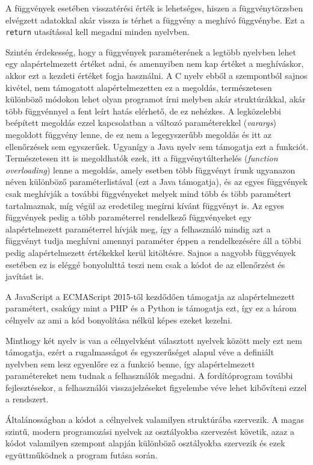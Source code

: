 A függvények esetében visszatérési érték is lehetséges, hiszen a függvénytörzsben elvégzett adatokkal akár vissza is térhet a függvény a meghívó függvénybe. Ezt a \texttt{return} utasítással kell megadni minden nyelvben.

Szintén érdekesség, hogy a függvények paraméterének a legtöbb nyelvben lehet egy alapértelmezett értéket adni, és amennyiben nem kap értéket a meghíváskor, akkor ezt a kezdeti értéket fogja használni.
A C nyelv ebből a szempontból sajnos kivétel, nem támogatott alapértelmezetten ez a megoldás, természetesen különböző módokon lehet olyan programot írni melyben akár struktúrákkal, akár több függvénnyel a fent leírt hatás elérhető, de ez nehézkes. A legközelebbi beépített megoldás ezzel kapcsolatban a változó paraméterekkel (\textit{varargs}) megoldott függvény lenne, de ez nem a legegyszerűbb megoldás és itt az ellenőrzések sem egyszerűek.
Ugyanígy a Java nyelv sem támogatja ezt a funkciót. Természetesen itt is megoldhatók ezek, itt a függvénytúlterhelés (\textit{function overloading}) lenne a megoldás, amely esetben több függvényt írunk ugyanazon néven különböző paraméterlistával (ezt a Java támogatja), és az egyes függvények csak meghívják a további függvényeket melyek mind több és több paramétert tartalmaznak, míg végül az eredetileg megírni kívánt függvényt is. Az egyes függvények pedig a több paraméterrel rendelkező függvényeket egy alapértelmezett paraméterrel hívják meg, így a felhasználó mindig azt a függvényt tudja meghívni amennyi paraméter éppen a rendelkezésére áll a többi pedig alapértelmezett értékekkel kerül kitöltésre. Sajnos a nagyobb függvények esetében ez is eléggé bonyolulttá teszi nem csak a kódot de az ellenőrzést és javítást is.

A JavaScript a ECMAScript 2015-től kezdődően támogatja az alapértelmezett paramétert, csakúgy mint a PHP és a Python is támogatja ezt, így ez a három célnyelv az ami a kód bonyolítása nélkül képes ezeket kezelni.

Minthogy két nyelv is van a célnyelvként választott nyelvek között mely ezt nem támogatja, ezért a rugalmasságot és egyszerűséget alapul véve a definiált nyelvben sem lesz egyenlőre ez a funkció benne, így alapértelmezett paramétereket nem tudnak a felhasználók megadni. A fordítóprogram további fejlesztésekor, a felhasználói visszajelzéseket figyelembe véve lehet kibővíteni ezzel a rendszert.


Általánosságban a kódot a célnyelvek valamilyen struktúrába szervezik. A magas szintű, modern programozási nyelvek az osztályokba szervezést követik, azaz a kódot valamilyen szempont alapján különböző osztályokba szervezik és ezek együttműködnek a program futása során.

